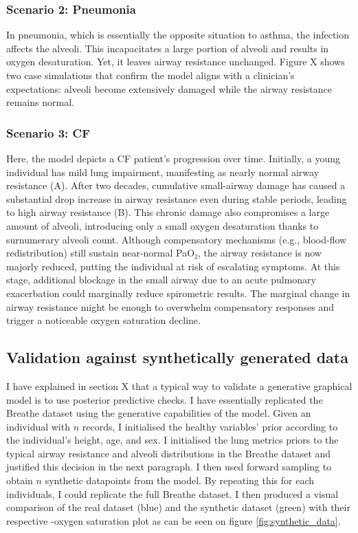 \subsubsection{Scenario 2: Pneumonia}
In pneumonia, which is essentially the opposite situation to asthma, the infection affects the alveoli. This incapacitates a large portion of alveoli and results in oxygen desaturation. Yet, it leaves airway resistance unchanged. Figure X shows two case simulations that confirm the model aligns with a clinician’s expectations: alveoli become extensively damaged while the airway resistance remains normal.

\subsubsection{Scenario 3: CF}
Here, the model depicts a CF patient’s progression over time. Initially, a young individual has mild lung impairment, manifesting as nearly normal airway resistance (A). After two decades, cumulative small-airway damage has caused a substantial drop increase in airway resistance even during stable periods, leading to high airway resistance (B). This chronic damage also compromises a large amount of alveoli, introducing only a small oxygen desaturation thanks to surnumerary alveoli count. Although compensatory mechanisms (e.g., blood-flow redistribution) still sustain near-normal PaO₂, the airway resistance is now majorly reduced, putting the individual at risk of escalating symptoms. At this stage, additional blockage in the small airway due to an acute pulmonary exacerbation could marginally reduce spirometric results. The marginal change in airway resistance might be enough to overwhelm compensatory responses and trigger a noticeable oxygen saturation decline.


\subsection{Validation against synthetically generated data}
I have explained in section X that a typical way to validate a generative graphical model is to use posterior predictive checks. I have essentially replicated the Breathe dataset using the generative capabilities of the model. Given an individual with $n$ records, I initialised the healthy variables' prior according to the individual's height, age, and sex. I initialised the lung metrics priors to the typical airway resistance and alveoli distributions in the Breathe dataset and justified this decision in the next paragraph. I then used forward sampling to obtain $n$ synthetic datapoints from the model. By repeating this for each individuals, I could replicate the full Breathe dataset. I then produced a visual comparison of the real dataset (blue) and the synthetic dataset (green) with their respective \F-oxygen saturation plot as can be seen on figure \ref{fig:synthetic_data}. 

